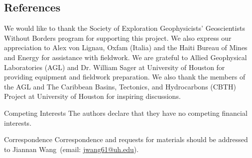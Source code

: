 \documentclass{nature}
\begin{document}
\subsection{References}
%
%


%
%
%
\clearpage
\begin{addendum}
 \item We would like to thank the Society of Exploration Geophysicists' Geoscientists Without Borders program for supporting this project. We also express our appreciation to Alex von Lignau, Oxfam (Italia) and the Haiti Bureau of Mines and Energy for assistance with fieldwork. We are grateful to Allied Geophysical Laboratories (AGL) and Dr. William Sager at University of Houston for providing equipment and fieldwork preparation. We also thank the members of the AGL and The Caribbean Basins, Tectonics, and Hydrocarbons (CBTH) Project at University of Houston for inspiring discussions.
 \item[Competing Interests] The authors declare that they have no
competing financial interests.
 \item[Correspondence] Correspondence and requests for materials
should be addressed to Jiannan Wang~(email: \href{mailto:jwang61@uh.edu}{jwang61@uh.edu}).
\end{addendum}
\end{document}

